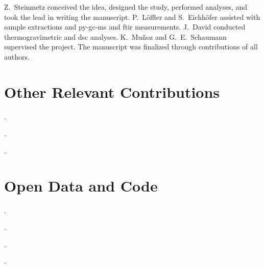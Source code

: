 \begin{description}
	\setlength\itemsep{0em}
	\item[Author contributions:] Z.~Steinmetz conceived the idea, designed the study, performed analyses, and took the lead in writing the manuscript. P.~Löffler and S.~Eichhöfer assisted with sample extractions and \ac{py-gc-ms} and \ac{ftir} measurements. J.~David conducted thermogravimetric and \ac{dsc} analyses. K.~Muñoz and G.~E.~Schaumann supervised the project. The manuscript was finalized through contributions of all authors.
\end{description}

\section*{Other Relevant Contributions}

\noindent{}.

\vspace{0.5\baselineskip}
\noindent{}.

\vspace{0.5\baselineskip}
\noindent{}.

\section*{Open Data and Code}

\noindent{}.

\vspace{0.5\baselineskip}
\noindent{}.

\vspace{0.5\baselineskip}
\noindent{}.

\vspace{0.5\baselineskip}
\noindent{}.
